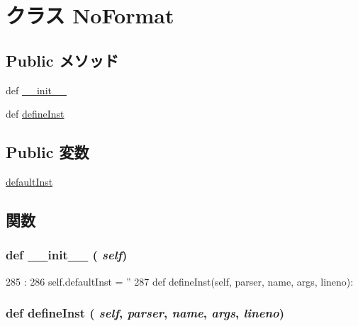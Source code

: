 \hypertarget{classisa__parser_1_1NoFormat}{
\section{クラス NoFormat}
\label{classisa__parser_1_1NoFormat}
}
\subsection*{Public メソッド}
\begin{DoxyCompactItemize}
\item 
def \hyperlink{classisa__parser_1_1NoFormat_ac775ee34451fdfa742b318538164070e}{\_\-\_\-init\_\-\_\-}
\item 
def \hyperlink{classisa__parser_1_1NoFormat_a3e5cbc15d52ce2de63894dbe9e35135f}{defineInst}
\end{DoxyCompactItemize}
\subsection*{Public 変数}
\begin{DoxyCompactItemize}
\item 
\hyperlink{classisa__parser_1_1NoFormat_a67bc6d696e25f3a04d5f4c0f9d9aa0f8}{defaultInst}
\end{DoxyCompactItemize}


\subsection{関数}
\hypertarget{classisa__parser_1_1NoFormat_ac775ee34451fdfa742b318538164070e}{
\subsubsection[{\_\-\_\-init\_\-\_\-}]{\setlength{\rightskip}{0pt plus 5cm}def \_\-\_\-init\_\-\_\- ( {\em self})}}
\label{classisa__parser_1_1NoFormat_ac775ee34451fdfa742b318538164070e}



\begin{DoxyCode}
285                       :
286         self.defaultInst = ''
287 
    def defineInst(self, parser, name, args, lineno):
\end{DoxyCode}
\hypertarget{classisa__parser_1_1NoFormat_a3e5cbc15d52ce2de63894dbe9e35135f}{
\subsubsection[{defineInst}]{\setlength{\rightskip}{0pt plus 5cm}def defineInst ( {\em self}, \/   {\em parser}, \/   {\em name}, \/   {\em args}, \/   {\em lineno})}}
\label{classisa__parser_1_1NoFormat_a3e5cbc15d52ce2de63894dbe9e35135f}



